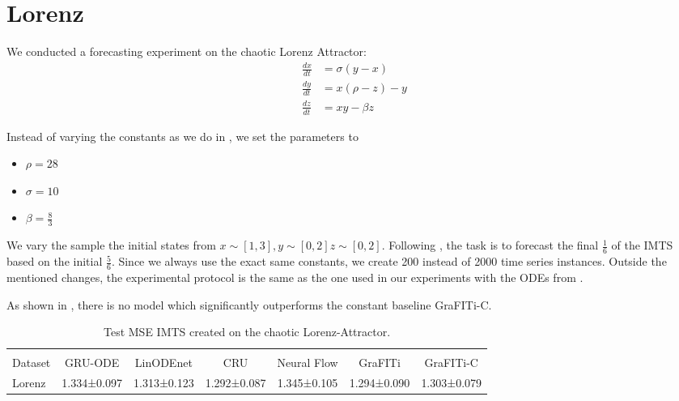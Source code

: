 \section{Lorenz}\label{app:lorenz}
We conducted a forecasting experiment on the chaotic Lorenz Attractor: 
\begin{align}
    \frac{dx}{dt} &= \sigma (y - x) \\
    \frac{dy}{dt} &= x (\rho - z) - y \\
    \frac{dz}{dt} &= xy - \beta z
\end{align}

Instead of varying the constants as we do in \Bench, we set the parameters to 
\begin{itemize}
    \item $\rho = 28$
    \item $\sigma = 10$
    \item $\beta=\frac{8}{3}$
\end{itemize}
We vary the sample the initial states from $x \sim [1,3], y\sim[0,2] z\sim[0,2]$.
Following \citet{Gilpin2021.Chaosa}, the task is to forecast the final $\frac{1}{6}$ of the IMTS based on the initial $\frac{5}{6}$.
Since we always use the exact same constants, we create 200 instead of 2000 time series instances. 
Outside the mentioned changes, the experimental protocol is the same as the one used in our experiments with the ODEs from \Bench.

As shown in , there is no model which significantly outperforms the constant baseline  GraFITi-C.

\begin{table}[!h]
    \scriptsize
    \caption{%
        Test MSE IMTS created on the chaotic Lorenz-Attractor.
    }\label{tab:lorenz}
    \centering
    \begin{tabular}{l cccccc}
        \toprule
    \\	Dataset & GRU-ODE & LinODEnet & CRU & Neural Flow & GraFITi & GraFITi-C
    \\	\midrule
        Lorenz & 1.334±0.097 & 1.313±0.123 & 1.292±0.087 & 1.345±0.105 & 1.294±0.090 & 1.303±0.079
    \\	\bottomrule
    \end{tabular}
\end{table}